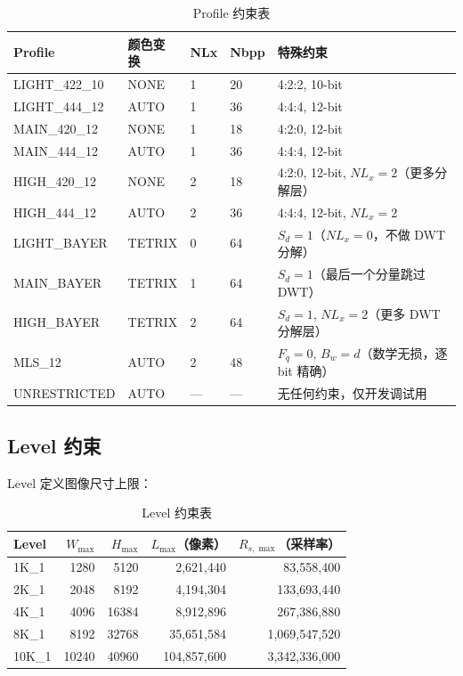 \begin{table}[H]
\centering
\caption{Profile 约束表}
\small
\begin{tabular}{@{}L{2.6cm}L{1.4cm}L{0.8cm}L{0.8cm}L{4.5cm}@{}}
\toprule
Profile & 颜色变换 & NLx & Nbpp & 特殊约束 \\
\midrule
LIGHT\_422\_10 & NONE & 1 & 20 & 4:2:2, 10-bit \\
LIGHT\_444\_12 & AUTO & 1 & 36 & 4:4:4, 12-bit \\
MAIN\_420\_12 & NONE & 1 & 18 & 4:2:0, 12-bit \\
MAIN\_444\_12 & AUTO & 1 & 36 & 4:4:4, 12-bit \\
HIGH\_420\_12 & NONE & 2 & 18 & 4:2:0, 12-bit, $NL_x=2$（更多分解层） \\
HIGH\_444\_12 & AUTO & 2 & 36 & 4:4:4, 12-bit, $NL_x=2$ \\
LIGHT\_BAYER & TETRIX & 0 & 64 & $S_d=1$（$NL_x=0$，不做 DWT 分解） \\
MAIN\_BAYER & TETRIX & 1 & 64 & $S_d=1$（最后一个分量跳过 DWT） \\
HIGH\_BAYER & TETRIX & 2 & 64 & $S_d=1$, $NL_x=2$（更多 DWT 分解层） \\
MLS\_12 & AUTO & 2 & 48 & $F_q=0$, $B_w=d$（数学无损，逐 bit 精确） \\
UNRESTRICTED & AUTO & --- & --- & 无任何约束，仅开发调试用 \\
\bottomrule
\end{tabular}
\end{table}

\subsection{Level 约束}

Level 定义图像尺寸上限：

\begin{table}[H]
\centering
\caption{Level 约束表}
\small
\begin{tabular}{@{}lrrrr@{}}
\toprule
Level & $W_{\max}$ & $H_{\max}$ & $L_{\max}$（像素） & $R_{s,\max}$（采样率） \\
\midrule
1K\_1 & 1280 & 5120 & 2,621,440 & 83,558,400 \\
2K\_1 & 2048 & 8192 & 4,194,304 & 133,693,440 \\
4K\_1 & 4096 & 16384 & 8,912,896 & 267,386,880 \\
8K\_1 & 8192 & 32768 & 35,651,584 & 1,069,547,520 \\
10K\_1 & 10240 & 40960 & 104,857,600 & 3,342,336,000 \\
\bottomrule
\end{tabular}
\end{table}


